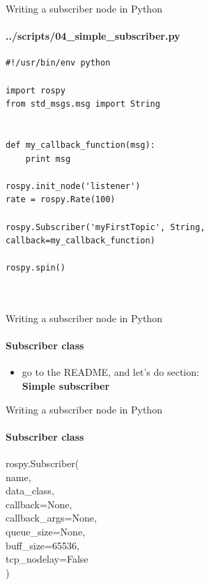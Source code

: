 \documentclass{beamer}
\begin{document}
\begin{frame}[fragile]{Writing a subscriber node in Python}
        \framesubtitle{../scripts/04\_simple\_subscriber.py}
        
    \begin{lstlisting}
#!/usr/bin/env python

import rospy
from std_msgs.msg import String


def my_callback_function(msg):
    print msg

rospy.init_node('listener')
rate = rospy.Rate(100)

rospy.Subscriber('myFirstTopic', String, callback=my_callback_function)

rospy.spin()

    
    \end{lstlisting}
\end{frame}



\begin{frame}[fragile]{Writing a subscriber node in Python}
    \framesubtitle{Subscriber class}
    
    
    \begin{itemize}
        \centering
        \item go to the README, and let's do section:\\ 
        \textbf{Simple subscriber}
    \end{itemize} 
\end{frame}


\begin{frame}[fragile]{Writing a subscriber node in Python}
    \framesubtitle{Subscriber class}
    \begin{focus}
        
        \ttfamily rospy.Subscriber(\\
        {\color{red}name},\\
        {\color{red}data\_class},\\
        {\color{blue}callback=None}, \\
        {\color{blue}callback\_args=None},\\
        {\color{blue}queue\_size=None},\\
        {\color{blue}buff\_size=65536},\\
        {\color{red}tcp\_nodelay=False}\\)
    \end{focus}
    
\end{frame}
\end{document}
